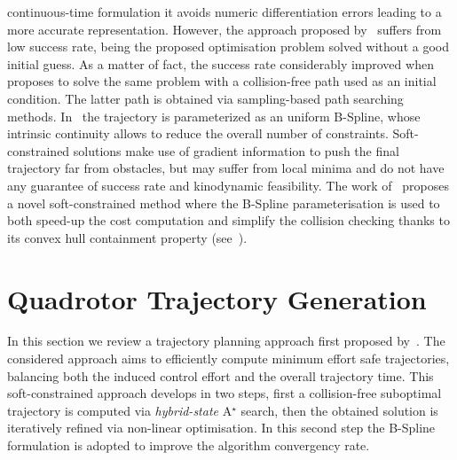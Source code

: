 continuous-time formulation it avoids numeric differentiation errors leading to a more accurate representation.
However, the approach proposed by~\cite{oleynikova2016continuous} suffers from low success rate, being the proposed optimisation problem
solved without a good initial guess.
As a matter of fact, the success rate considerably improved when~\cite{gao2017gradient} proposes to solve the same problem
with a collision-free path used as an initial condition. The latter path is obtained via sampling-based path searching methods.
In~\cite{usenko2017real} the trajectory is parameterized as an uniform B-Spline, whose intrinsic continuity allows to reduce
the overall number of constraints.
Soft-constrained solutions make use of gradient information to push the final trajectory far from obstacles, but may suffer from
local minima and do not have any guarantee of success rate and kinodynamic feasibility.
The work of~\cite{zhou2019robust} proposes a novel soft-constrained method where the B-Spline parameterisation is used to both
speed-up the cost computation and simplify the collision checking thanks to its convex hull containment property (see~).

\section{Quadrotor Trajectory Generation}
In this section we review a trajectory planning approach first proposed by~\cite{zhou2019robust}.
The considered approach aims to efficiently compute minimum effort safe trajectories, balancing both the induced control effort and
the overall trajectory time. This soft-constrained approach develops in two steps, first a collision-free suboptimal trajectory
is computed via \emph{hybrid-state} A$^{\star}$ search, then the obtained solution is iteratively refined via non-linear
optimisation. In this second step the B-Spline formulation is adopted to improve the algorithm convergency rate.

